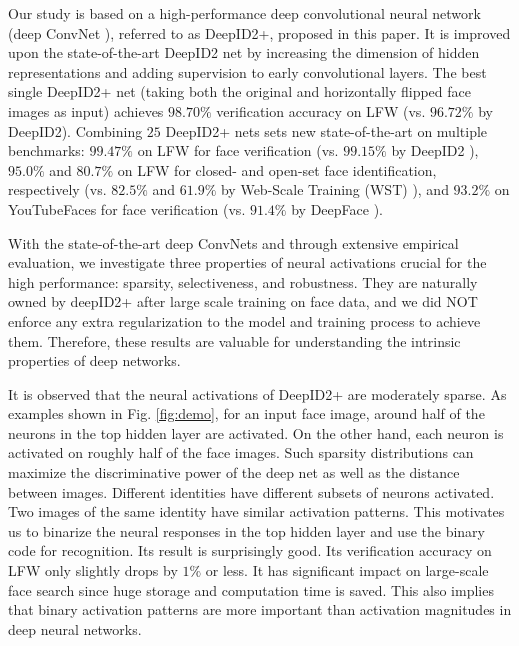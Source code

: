 \documentclass[10pt,twocolumn,letterpaper]{article}
\begin{document}
Our study is based on a high-performance deep convolutional neural network (deep ConvNet \cite{lecun1989,lecun1998}), referred to as DeepID2+, proposed in this paper. It is improved upon the  state-of-the-art DeepID2 net \cite{sun2014b} by increasing the dimension of hidden representations and adding  supervision to early convolutional layers. The best single DeepID2+ net (taking both the original and horizontally flipped face images as input) achieves $98.70\%$ verification accuracy on LFW (vs. $96.72\%$ by DeepID2). Combining $25$ DeepID2+ nets sets new state-of-the-art on multiple benchmarks:  $99.47\%$ on LFW for face verification (vs. $99.15\%$ by DeepID2 \cite{sun2014b}),  $95.0\%$ and $80.7\%$ on LFW for closed- and open-set face identification, respectively (vs. $82.5\%$ and $61.9\%$ by Web-Scale Training (WST) \cite{taigman2014b}), and $93.2\%$ on YouTubeFaces \cite{wolf2011} for face verification (vs. $91.4\%$ by DeepFace \cite{taigman2014a}).

With the state-of-the-art deep ConvNets and through extensive empirical evaluation, we investigate three properties of  neural activations crucial for  the high performance: sparsity, selectiveness, and robustness. They are naturally owned by deepID2+ after large scale training on face data, and we did NOT enforce any extra regularization to the model and training process to achieve them. Therefore, these results are valuable for understanding the intrinsic properties of deep  networks.

It is observed that the neural activations of DeepID2+ are moderately sparse. As examples shown in Fig. \ref{fig:demo}, for an input face image, around half of the neurons in the top hidden layer are activated. On the other hand, each neuron is activated on roughly half of the face images. Such sparsity distributions can maximize the discriminative power of  the deep net as well as the distance between images. Different identities have different subsets of neurons activated. Two images of the same identity have similar activation patterns. This motivates us to binarize the neural responses in the top hidden layer and  use the binary code for  recognition. Its result is surprisingly good. Its verification accuracy on LFW only slightly drops by $1\%$ or less. It has significant impact on large-scale face search since huge storage and computation time is saved. This also implies that binary activation patterns are more important than activation magnitudes in deep neural networks.
\end{document}
